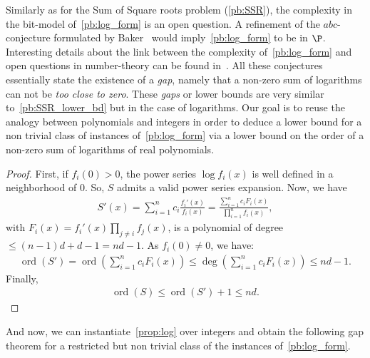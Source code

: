\documentclass[a4paper, 11pt,dvipsnames]{article}
\newcommand\parc[1]{\left(#1\right)}
\newcommand{\ord}{\operatorname{ord}}
\begin{document}
  Similarly as for the Sum of Square roots problem (\cref{pb:SSR}), the complexity in the bit-model of~\cref{pb:log_form} is an open question. A refinement of
  the $abc$-conjecture formulated by Baker~\cite{BakerWustholz1993} would imply~\cref{pb:log_form} to be in $\P$. Interesting details about the link between the
  complexity of~\cref{pb:log_form} and open questions in number-theory can be found in~\cite{etessami2014note}. All these conjectures essentially state the
  existence of a \emph{gap}, namely that a non-zero sum of logarithms can not be \emph{too close to zero}. These \emph{gaps} or lower bounds are very similar
  to~\cref{pb:SSR_lower_bd} but in the case of logarithms. Our goal is to reuse the analogy between polynomials and integers in order to deduce a lower bound
  for a non trivial class of instances of~\cref{pb:log_form} via a lower bound on the order of a non-zero sum of logarithms of real polynomials.

\sumoflogsorderboundprop*
\begin{proof}
    First, if $f_i(0) > 0$, the power series $\log f_i(x)$ is well defined in a neighborhood of 0. So, $S$ admits a valid power series expansion.
    Now, we have \begin{align*} S'(x) = \sum_{i=1}^n c_i \frac{f_i'(x)}{f_i(x)} = \frac{\sum_{i=1}^n c_i F_i(x)}{\prod_{i=1}^n f_i(x)}, \end{align*} with
    $F_i(x) = f_i'(x) \prod_{j \neq i} f_j(x)$, is a polynomial of degree $\le (n-1)d + d-1 = nd -1 $. As $f_i(0) \neq 0$, we have:
    \begin{align*} \ord(S') = \ord\parc{\sum_{i=1}^n c_i F_i(x)} \le \deg \parc{\sum_{i=1}^n c_i F_i(x)} \le nd - 1.  
    \end{align*} Finally,
    \begin{align*} 
      \ord(S) \le \ord(S') +1 \le nd.  
    \end{align*} 
  \end{proof}

     And now, we can instantiate~\cref{prop:log} over integers and obtain the following gap theorem for a restricted but non trivial class of the instances
    of~\cref{pb:log_form}.
\end{document}
